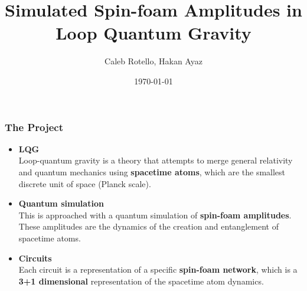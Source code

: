 \documentclass{beamer}
\title[QPU Project]{Simulated Spin-foam Amplitudes in Loop Quantum Gravity} %
\author{Caleb Rotello, Hakan Ayaz} %
\institute[CSM] %
{
Colorado School of Mines \\ %
}
\date{\today} %
\begin{document}
\begin{frame}
\titlepage %
\end{frame}



\begin{frame}
    \frametitle{The Project}
    \begin{itemize}
        \item \textbf{LQG}\\
        Loop-quantum gravity is a theory that attempts to merge general relativity and quantum mechanics using \textbf{spacetime atoms}, which are the smallest discrete unit of space (Planck scale). 
        \bigbreak
        \item \textbf{Quantum simulation}\\
        This is approached with a quantum simulation of \textbf{spin-foam amplitudes}. These amplitudes are the dynamics of the creation and entanglement of spacetime atoms.
        \bigbreak
        \item \textbf{Circuits}\\
        Each circuit is a representation of a specific \textbf{spin-foam network}, which is a \textbf{3+1 dimensional} representation of the spacetime atom dynamics.
    \end{itemize}
\end{frame}

% 
%    
\end{document}
